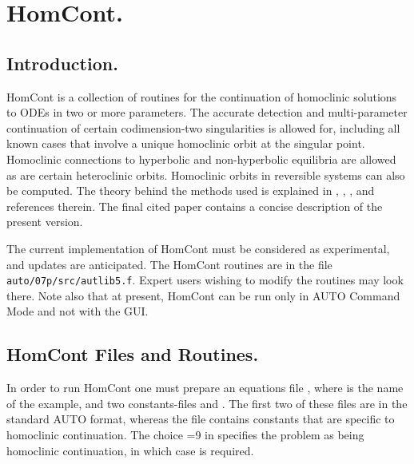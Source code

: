 \documentclass[12pt]{report}
\begin{document}
\chapter{ {\cal HomCont}.} \label{ch:HomCont}
\section{ Introduction.} \label{sec:HomCont_Intro}
{\cal HomCont} is a collection of routines for the continuation 
of homoclinic solutions to ODEs in two or more parameters.
The accurate detection and multi-parameter continuation of certain
codimension-two singularities is allowed for, including all known
cases that involve a unique homoclinic orbit at the singular point.
Homoclinic connections to hyperbolic and non-hyperbolic equilibria are 
allowed as are certain heteroclinic orbits. 
Homoclinic orbits in reversible systems can also be computed.
The theory behind the methods used is
explained in , ,
 \citeyear{Sa:95,Sa:95a},  and
references therein.  The final cited paper contains a concise
description of the present version. 

The current implementation of {\cal HomCont} must be considered as experimental,
and updates are anticipated.
The {\cal HomCont} routines are in the file {\tt auto/07p/src/autlib5.f}. 
Expert users wishing to modify the routines may look there.
Note also that at present, {\cal HomCont} can be run only in 
{\cal AUTO} Command Mode and not with the GUI. 


\section{{\cal HomCont} Files and Routines.} \label{sec:HomCont_files}

In order to run {\cal HomCont} one must prepare an equations file , 
where  is the name of the example, 
and two constants-files  and .
The first two of these files are in the standard {\cal AUTO} format, 
whereas the  file
contains constants that are specific to homoclinic continuation.
The choice =9 in  specifies the problem as
being homoclinic continuation, in which case  is required.
\end{document}
